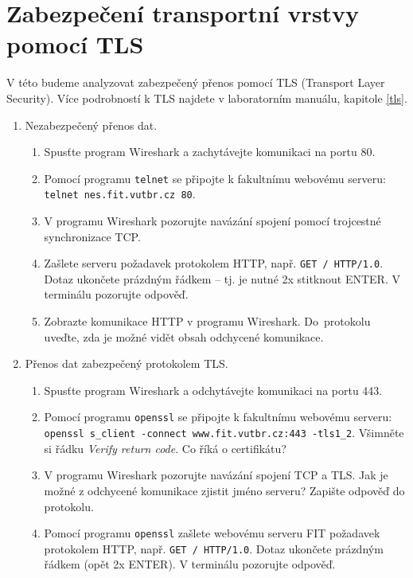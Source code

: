 \documentclass[a4paper,11pt]{article}
\begin{document}
\section{Zabezpečení transportní vrstvy pomocí TLS}
V této budeme analyzovat zabezpečený přenos pomocí TLS (Transport Layer Security). Více podrobností k TLS najdete v laboratorním manuálu, kapitole \ref{tls}. 
\begin{enumerate}
  \item Nezabezpečený přenos dat.
    \begin{enumerate}
      \item Spusťte program Wireshark a zachytávejte komunikaci na portu 80.
      \item Pomocí programu {\tt telnet} se připojte k fakultnímu webovému
        serveru: \\ \verb|telnet nes.fit.vutbr.cz 80|.
      \item V programu Wireshark pozorujte navázání spojení pomocí trojcestné synchronizace TCP.
      \item Zašlete serveru požadavek protokolem HTTP, např. \verb|GET / HTTP/1.0|. Dotaz ukončete prázdným řádkem -- tj. je nutné 2x stitknout ENTER. V terminálu pozorujte odpověď.
      \item Zobrazte komunikace HTTP v programu Wireshark.  Do~protokolu uveďte, zda je možné vidět obsah odchycené komunikace.
    \end{enumerate}

  \item Přenos dat zabezpečený protokolem TLS.
    \begin{enumerate}
      \item Spusťte program Wireshark a odchytávejte komunikaci na portu 443.
      \item Pomocí programu {\tt openssl} se připojte k fakultnímu webovému  serveru: \\ \verb|openssl s_client -connect www.fit.vutbr.cz:443 -tls1_2|. Všimněte si řádku \emph{Verify return code}. Co říká o certifikátu?

      \item V programu Wireshark pozorujte navázání spojení TCP a TLS. Jak je možné z odchycené komunikace zjistit jméno serveru? Zapište odpověď do protokolu.

      \item Pomocí programu \texttt{openssl} zašlete webovému serveru FIT požadavek protokolem HTTP, např. \verb|GET / HTTP/1.0|. Dotaz ukončete prázdným řádkem (opět 2x ENTER). V terminálu pozorujte odpověď.


\end{enumerate}
\end{enumerate}
\end{document}
